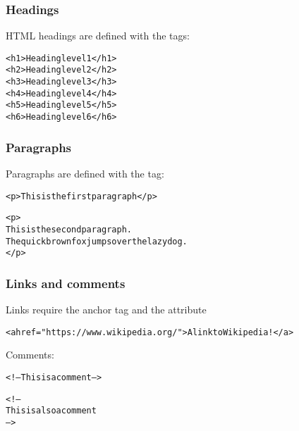 \documentclass[12pt]{beamer}\usepackage[]{graphicx}\usepackage[]{color}
\makeatletter
\newcommand{\hlstr}[1]{\textcolor[rgb]{0.192,0.494,0.8}{#1}}%
\newenvironment{kframe}{%
 \def\at@end@of@kframe{}%
 \ifinner\ifhmode%
  \def\at@end@of@kframe{\end{minipage}}%
  \begin{minipage}{\columnwidth}%
 \fi\fi%
 \def\FrameCommand##1{\hskip\@totalleftmargin \hskip-\fboxsep
 \colorbox{shadecolor}{##1}\hskip-\fboxsep
     \hskip-\linewidth \hskip-\@totalleftmargin \hskip\columnwidth}%
 \MakeFramed {\advance\hsize-\width
   \@totalleftmargin\z@ \linewidth\hsize
   \@setminipage}}%
 {\par\unskip\endMakeFramed%
 \at@end@of@kframe}
\newenvironment{knitrout}{}{} %
\makeatother
\begin{document}
\begin{frame}[fragile]
\frametitle{Headings}

HTML headings are defined with the {\hilit {}} tags:
\begin{knitrout}\footnotesize
{}\color{fgcolor}\begin{kframe}
\begin{alltt}
<h1>Heading level 1</h1>
<h2>Heading level 2</h2>
<h3>Heading level 3</h3>
<h4>Heading level 4</h4>
<h5>Heading level 5</h5>
<h6>Heading level 6</h6>
\end{alltt}
\end{kframe}
\end{knitrout}

\end{frame}


\begin{frame}[fragile]
\frametitle{Paragraphs}

Paragraphs are defined with the {\hilit {}} tag:
\begin{knitrout}\footnotesize
{}\color{fgcolor}\begin{kframe}
\begin{alltt}
<p>This is the first paragraph</p>
  
<p>
  This is the second paragraph.
  The quick brown fox jumps over the lazy dog.
</p>
\end{alltt}
\end{kframe}
\end{knitrout}

\end{frame}


\begin{frame}[fragile]
\frametitle{Links and comments}

Links require the anchor tag {\hilit {}} and the attribute {\hilit {}}
\begin{knitrout}\footnotesize
{}\color{fgcolor}\begin{kframe}
\begin{alltt}
<a href=\hlstr{"https://www.wikipedia.org/"}>A link to Wikipedia!</a>
\end{alltt}
\end{kframe}
\end{knitrout}

\bigskip
Comments:
\begin{knitrout}\footnotesize
{}\color{fgcolor}\begin{kframe}
\begin{alltt}
<!-- This is a comment -->
  
<!-- 
  This is also a comment 
-->
\end{alltt}
\end{kframe}
\end{knitrout}

\end{frame}
\end{document}

